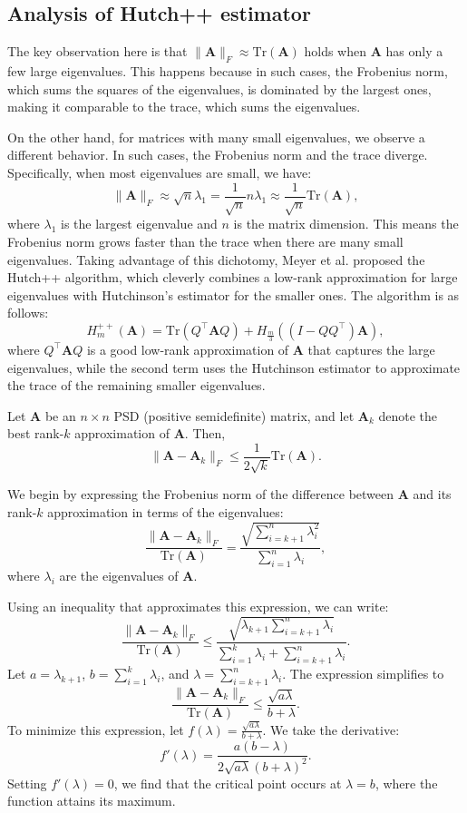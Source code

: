 \subsection{Analysis of Hutch++ estimator}
\label{sec:appendix_hutchpp}
The key observation here is that $\|\mathbf{A}\|_F \approx \mathrm{Tr}(\mathbf{A})$ holds when $\mathbf{A}$ has only a few large eigenvalues. This happens because in such cases, the Frobenius norm, which sums the squares of the eigenvalues, is dominated by the largest ones, making it comparable to the trace, which sums the eigenvalues. 

On the other hand, for matrices with many small eigenvalues, we observe a different behavior. In such cases, the Frobenius norm and the trace diverge. Specifically, when most eigenvalues are small, we have:
\[
\|\mathbf{A}\|_F \approx \sqrt{n} \lambda_1 = \frac{1}{\sqrt{n}} n \lambda_1 \approx \frac{1}{\sqrt{n}} \mathrm{Tr}(\mathbf{A}),
\]
where $\lambda_1$ is the largest eigenvalue and $n$ is the matrix dimension. This means the Frobenius norm grows faster than the trace when there are many small eigenvalues.
Taking advantage of this dichotomy, Meyer et al. proposed the Hutch++ algorithm, which cleverly combines a low-rank approximation for large eigenvalues with Hutchinson’s estimator for the smaller ones. The algorithm is as follows:
$$
H_m^{++}(\mathbf{A}) = \mathrm{Tr}(Q^\top\mathbf{A}Q) + H_{\frac{m}{3}}((I-QQ^\top)\mathbf{A}),
$$
\newpage
where $Q^\top\mathbf{A}Q$ is a good low-rank approximation of $\mathbf{A}$ that captures the large eigenvalues, while the second term uses the Hutchinson estimator to approximate the trace of the remaining smaller eigenvalues.

\begin{lemma}
Let $\mathbf{A}$ be an $n \times n$ PSD (positive semidefinite) matrix, and let $\mathbf{A}_k$ denote the best rank-$k$ approximation of $\mathbf{A}$. Then,
\[
\|\mathbf{A} - \mathbf{A}_k\|_F \le \frac{1}{2\sqrt{k}} \mathrm{Tr}(\mathbf{A}).
\]
\end{lemma}

We begin by expressing the Frobenius norm of the difference between $\mathbf{A}$ and its rank-$k$ approximation in terms of the eigenvalues:
\[
\frac{\|\mathbf{A} - \mathbf{A}_k\|_F}{\mathrm{Tr}(\mathbf{A})} = \frac{\sqrt{\sum_{i=k+1}^{n} \lambda_i^2}}{\sum_{i=1}^{n} \lambda_i},
\]
where $\lambda_i$ are the eigenvalues of $\mathbf{A}$.

Using an inequality that approximates this expression, we can write:
\[
\frac{\|\mathbf{A} - \mathbf{A}_k\|_F}{\mathrm{Tr}(\mathbf{A})} \le \frac{\sqrt{\lambda_{k+1} \sum_{i=k+1}^{n} \lambda_i}}{\sum_{i=1}^{k} \lambda_i + \sum_{i=k+1}^{n} \lambda_i}.
\]
Let $a = \lambda_{k+1}$, $b = \sum_{i=1}^{k} \lambda_i$, and $\lambda = \sum_{i=k+1}^{n} \lambda_i$. The expression simplifies to
\[
\frac{\|\mathbf{A} - \mathbf{A}_k\|_F}{\mathrm{Tr}(\mathbf{A})} \le \frac{\sqrt{a\lambda}}{b + \lambda}.
\]
To minimize this expression, let $f(\lambda) = \frac{\sqrt{a\lambda}}{b + \lambda}$. We take the derivative:
\[
f'(\lambda) = \frac{a(b - \lambda)}{2\sqrt{a\lambda}(b + \lambda)^2}.
\]
Setting $f'(\lambda) = 0$, we find that the critical point occurs at $\lambda = b$, where the function attains its maximum.

